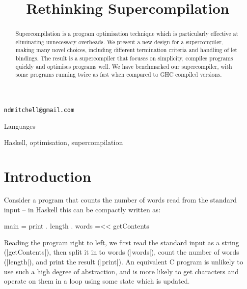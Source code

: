 \documentclass[draft]{sigplanconf}
\begin{document}

\titlebanner{\today{} - \currenttime{}}        %
\preprintfooter{}   %

\title{Rethinking Supercompilation}

           {\verb"ndmitchell@gmail.com"}

\maketitle


\begin{abstract}
Supercompilation is a program optimisation technique which is particularly effective at eliminating unnecessary overheads. We present a new design for a supercompiler, making many novel choices, including different termination criteria and handling of let bindings. The result is a supercompiler that focuses on simplicity, compiles programs quickly and optimises programs well. We have benchmarked our supercompiler, with some programs running twice as fast when compared to GHC compiled versions.
\end{abstract}


\terms
Languages

\keywords
Haskell, optimisation, supercompilation

\section{Introduction}
\label{sec:introduction}

Consider a program that counts the number of words read from the standard input -- in Haskell \cite{haskell} this can be compactly written as:

\begin{code}
main = print . length . words =<< getContents
\end{code}

Reading the program right to left, we first read the standard input as a string (|getContents|), then split it in to words (|words|), count the number of words (|length|), and print the result (|print|). An equivalent C program is unlikely to use such a high degree of abstraction, and is more likely to get characters and operate on them in a loop using some state which is updated.
\end{document}
